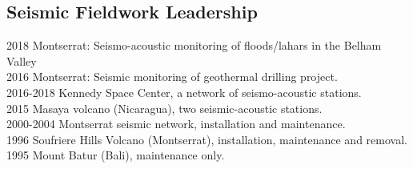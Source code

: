 \documentclass[margin,line]{res}
\begin{document}
\begin{resume}
\section{\sc Seismic Fieldwork Leadership}%
2018 Montserrat: Seismo-acoustic monitoring of floods/lahars in the Belham Valley\\
2016 Montserrat: Seismic monitoring of geothermal drilling project.\\
2016-2018 Kennedy Space Center, a network of seismo-acoustic stations.\\
2015 Masaya volcano (Nicaragua), two seismic-acoustic stations.\\
2000-2004 Montserrat seismic network, installation and maintenance.\\
1996 Soufriere Hills Volcano (Montserrat), installation, maintenance and removal.\\
1995 Mount Batur (Bali), maintenance only.\\

\begin{comment}

\end{comment}
\end{resume}
\end{document}
